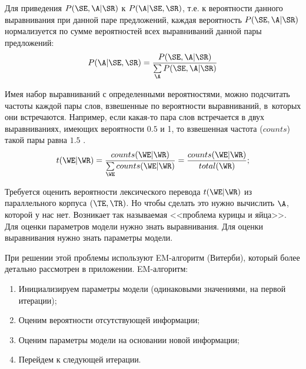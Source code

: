 Для приведения $P(\SE, \A| \SR)$ к $P(\A | \SE, \SR)$, 
т.е. к вероятности данного выравнивания при данной паре предложений, 
каждая вероятность $P(\SE, \A| \SR)$ нормализуется по сумме вероятностей 
всех выравниваний данной пары предложений:
\[
	P(\A | \SE, \SR) = \dfrac{P(\SE, \A| \SR)}
		{\sum\limits_{\A} P(\SE, \A| \SR)}
\]

Имея набор выравниваний с определенными вероятностями, 
можно подсчитать частоты каждой пары слов, 
взвешенные по вероятности выравниваний, в~которых они встречаются. 
Например, если какая-то пара слов встречается в двух выравниваниях, 
имеющих вероятности $0.5$ и 1, то взвешенная частота ($counts$) 
такой пары равна $1.5$ \cite{Рахимбердиев:2003}.
\[
	t(\WE|\WR) 
		=  \dfrac{counts(\WE|\WR)}{\sum\limits_{\WE}counts(\WE|\WR)} 
		= \dfrac{counts(\WE|\WR)}{total(\WR)};
\]

Требуется оценить вероятности лексического перевода $t(\WE|\WR)$ 
из параллельного корпуса $(\TE, \TR)$.
Но чтобы сделать это нужно вычислить $\A$, которой у нас нет.
Возникает так называемая <<проблема курицы и яйца>>.
Для оценки параметров модели нужно знать выравнивания.
Для оценки выравнивания нужно знать параметры модели.

\pagebreak
При решении этой проблемы используют EM-алгоритм (Витерби), 
который более детально рассмотрен в приложении. EM-алгоритм:
\begin{enumerate}
	\item Инициализируем параметры модели (одинаковыми значениями, на первой итерации);
	\item Оценим вероятности отсутствующей информации;
	\item Оценим параметры модели на основании новой информации;
	\item Перейдем к следующей итерации.
\end{enumerate}


